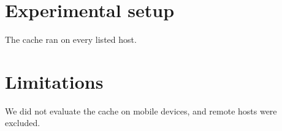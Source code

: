 \section{Experimental setup}
The cache ran on every listed host.
\section{Limitations}
We did not evaluate the cache on mobile devices, and remote hosts were excluded.
